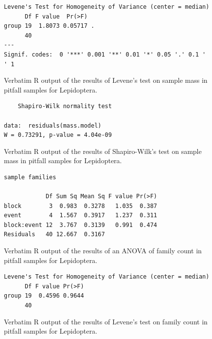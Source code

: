 \documentclass[10pt,letterpaper,twocolumn]{article}
\begin{document}
\begin{figure}[h]
	\lstset{numbers=left}
	\lstset{xleftmargin=5mm,framexleftmargin=5mm}
	\begin{lstlisting}
Levene's Test for Homogeneity of Variance (center = median)
      Df F value  Pr(>F)  
group 19  1.8073 0.05717 .
      40                  
---
Signif. codes:  0 '***' 0.001 '**' 0.01 '*' 0.05 '.' 0.1 ' ' 1
	\end{lstlisting}
	\caption{Verbatim R output of the results of Levene's test on sample mass in pitfall samples for Lepidoptera.}
	\label{fig:pitfall_lepidoptera_mass_levene}
	\smallskip
	\nointerlineskip
	\hrulefill
\end{figure}

\begin{figure}[h]
	\lstset{numbers=left}
	\lstset{xleftmargin=5mm,framexleftmargin=5mm}
	\begin{lstlisting}
	Shapiro-Wilk normality test

data:  residuals(mass.model)
W = 0.73291, p-value = 4.04e-09
	\end{lstlisting}
	\caption{Verbatim R output of the results of Shapiro-Wilk's test on sample mass in pitfall samples for Lepidoptera.}
	\label{fig:pitfall_lepidoptera_mass_shapiro}
	\smallskip
	\nointerlineskip
	\hrulefill
\end{figure}

\begin{figure}[h]
	\lstset{numbers=left}
	\lstset{xleftmargin=5mm,framexleftmargin=5mm}
	\begin{lstlisting}
sample families 

            Df Sum Sq Mean Sq F value Pr(>F)
block        3  0.983  0.3278   1.035  0.387
event        4  1.567  0.3917   1.237  0.311
block:event 12  3.767  0.3139   0.991  0.474
Residuals   40 12.667  0.3167               
	\end{lstlisting}
	\caption{Verbatim R output of the results of an ANOVA of family count in pitfall samples for Lepidoptera.}
	\label{fig:pitfall_lepidoptera_family_anova}
	\smallskip
	\nointerlineskip
	\hrulefill
\end{figure}

\begin{figure}[h]
	\lstset{numbers=left}
	\lstset{xleftmargin=5mm,framexleftmargin=5mm}
	\begin{lstlisting}
Levene's Test for Homogeneity of Variance (center = median)
      Df F value Pr(>F)
group 19  0.4596 0.9644
      40               
	\end{lstlisting}
	\caption{Verbatim R output of the results of Levene's test on family count in pitfall samples for Lepidoptera.}
	\label{fig:pitfall_lepidoptera_family_levene}
	\smallskip
	\nointerlineskip
	\hrulefill
\end{figure}
\end{document}
